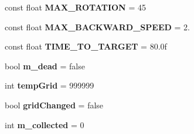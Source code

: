 \begin{DoxyCompactItemize}
const float {\bfseries M\+A\+X\+\_\+\+R\+O\+T\+A\+T\+I\+ON} = 45
\item 
\mbox{\label{class_enemy_abddbcc00a65eeeca190dfc6fb38a3c1e}} 
const float {\bfseries M\+A\+X\+\_\+\+B\+A\+C\+K\+W\+A\+R\+D\+\_\+\+S\+P\+E\+ED} = 2.
\item 
\mbox{\label{class_enemy_ae49ae28e2fc4e891816689134abe2dd4}} 
const float {\bfseries T\+I\+M\+E\+\_\+\+T\+O\+\_\+\+T\+A\+R\+G\+ET} = 80.\+0f
\item 
\mbox{\label{class_enemy_a82eb0830212a6c890e45582fa4f4a6cd}} 
bool {\bfseries m\+\_\+dead} = false
\item 
\mbox{\label{class_enemy_afb2476243d62d31863b480faa4a837a8}} 
int {\bfseries temp\+Grid} = 999999
\item 
\mbox{\label{class_enemy_a39c580a5713f911c3ac8a9f44eb6f224}} 
bool {\bfseries grid\+Changed} = false
\item 
\mbox{\label{class_enemy_a424c98f9185a0147da6d634dfaa85070}} 
int {\bfseries m\+\_\+collected} = 0
\end{DoxyCompactItemize}
